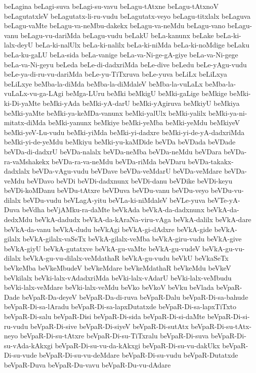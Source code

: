 {beLagina
beLagi-suva
beLagi-su-vavu
beLagu-tAtxne
beLagu-tAtxnoV
beLagutatxleV
beLagutatx-li-ru-vudu
beLagutatx-veyo
beLagu-titxlalx
beLaguva
beLagu-vaMte
beLagu-va-neMbu-dakekx
beLagu-va-neMdu
beLagu-vano
beLagu-vanu
beLagu-vu-dariMda
beLagu-vudu
beLakU
beLa-kanunx
beLake
beLa-ki-lalx-deyU
beLa-ki-nalUlx
beLa-ki-nalilx
beLa-ki-niMda
beLa-ki-noMdige
beLaku
beLa-ku-gaLU
beLa-sida
beLa-vanige
beLa-va-Ni-ge-gA-giye
beLa-va-Ni-gege
beLa-va-Ni-geyu
beLeda
beLe-di-dadxriMda
beLe-dive
beLedu
beLe-yAgu-vudu
beLe-ya-di-ru-vu-dariMda
beLe-yu-TiTxruva
beLe-yuva
beLiLx
beLiLxya
beLiLxye
beMba-la-diMda
beMba-la-diMdaleV
beMba-la-vuLaLx
beMba-la-vuLaLx-vu-ga-LAgi
beMga-LUru
beMki
beMkigU
beMki-gaLige
beMkige
beMki-ki-Di-yaMte
beMki-yAda
beMki-yA-darU
beMki-yAgiruva
beMkiyU
beMkiya
beMki-yaMte
beMki-ya-keMDa-vanunx
beMki-yalUlx
beMki-yalilx
beMki-ya-ni-mitatx-diMda
beMki-yanunx
beMkiye
beMki-yeMba
beMki-yeMdu
beMkiyeV
beMki-yeV-Lu-vudu
beMki-yiMda
beMki-yi-dadxre
beMki-yi-de-yA-dadxriMda
beMki-yi-de-yeMdu
beMkiyu
beMki-yu-kaMDide
beVDa
beVDada
beVDade
beVDa-di-dadxrU
beVDa-nalalx
beVDa-neMba
beVDa-neMdu
beVDara
beVDa-ra-vaMshakekx
beVDa-ra-va-neMdu
beVDa-riMda
beVDaru
beVDa-takakx-dadxlalx
beVDa-vAgu-vudu
beVDave
beVDa-veMdarU
beVDa-veMdare
beVDa-veMdu
beVDavo
beVDi
beVDi-dadxnunx
beVDi-danu
beVDike
beVDi-keyu
beVDi-koMDanu
beVDu-tAtxre
beVDuva
beVDu-vanu
beVDu-veyo
beVDu-vu-dilalx
beVDu-vudu
beVLagA-yitu
beVLa-ki-niMdaleV
beVLe-yuva
beVTe-yA-Duva
beVdha
beVjAMku-ra-daMte
beVkAda
beVkA-da-dadxnunx
beVkA-da-dedxMdu
beVkA-dadudx
beVkA-da-kAraNa-viru-vAga
beVkA-dalilx
beVkA-dare
beVkA-da-vanu
beVkA-dudu
beVkAgi
beVkA-gi-dAdxre
beVkA-gide
beVkA-gilalx
beVkA-gilalx-vaSeTx
beVkA-gilalx-veMba
beVkA-giru-vudu
beVkA-give
beVkA-giyU
beVkA-gutatxve
beVkA-gu-vaMte
beVkA-gu-vudeV
beVkA-gu-vu-dilalx
beVkA-gu-vu-dilalx-veMdathaR
beVkA-gu-vudu
beVkU
beVkaSeTx
beVkeMba
beVkeMbudeV
beVkeMdare
beVkeMdathaR
beVkeMdu
beVkeV
beVkilalx
beVki-lalx-vAdadxriMda
beVki-lalx-vAdarU
beVki-lalx-veMbudu
beVki-lalx-veMdare
beVki-lalx-veMdu
beVko
beVkoV
beVku
beVlada
beVpaR-Dade
beVpaR-Da-deyeV
beVpaR-Da-di-ruva
beVpaR-Dalu
beVpaR-Di-sa-bahude
beVpaR-Di-sa-lAradu
beVpaR-Di-sa-lapxDutatxde
beVpaR-Di-sa-lapxTiTxto
beVpaR-Di-salu
beVpaR-Disi
beVpaR-Di-sida
beVpaR-Di-si-daMte
beVpaR-Di-si-ru-vudu
beVpaR-Di-sive
beVpaR-Di-siyeV
beVpaR-Di-sutAtx
beVpaR-Di-su-tAtx-neyo
beVpaR-Di-su-tAtxre
beVpaR-Di-su-TiTxralu
beVpaR-Di-suva
beVpaR-Di-su-vAda-kAkxgi
beVpaR-Di-su-vu-da-kAkxgi
beVpaR-Di-su-vu-dakUkx
beVpaR-Di-su-vude
beVpaR-Di-su-vu-deMdare
beVpaR-Di-su-vudu
beVpaR-Dutatxde
beVpaR-Duva
beVpaR-Du-vavu
beVpaR-Du-vu-dAdare
}
